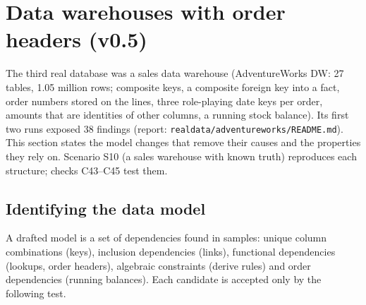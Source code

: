 \section{Data warehouses with order headers (v0.5)}\label{sec:v05}
The third real database was a sales data warehouse (AdventureWorks DW: 27 tables, 1.05 million rows; composite keys, a composite foreign key into a fact, order numbers stored on the lines, three role-playing date keys per order, amounts that are identities of other columns, a running stock balance). Its first two runs exposed 38 findings (report: \texttt{realdata/adventureworks/README.md}). This section states the model changes that remove their causes and the properties they rely on. Scenario S10 (a sales warehouse with known truth) reproduces each structure; checks C43--C45 test them.

\subsection{Identifying the data model}
A drafted model is a set of dependencies found in samples: unique column combinations (keys), inclusion dependencies (links), functional dependencies (lookups, order headers), algebraic constraints (derive rules) and order dependencies (running balances). Each candidate is accepted only by the following test.

